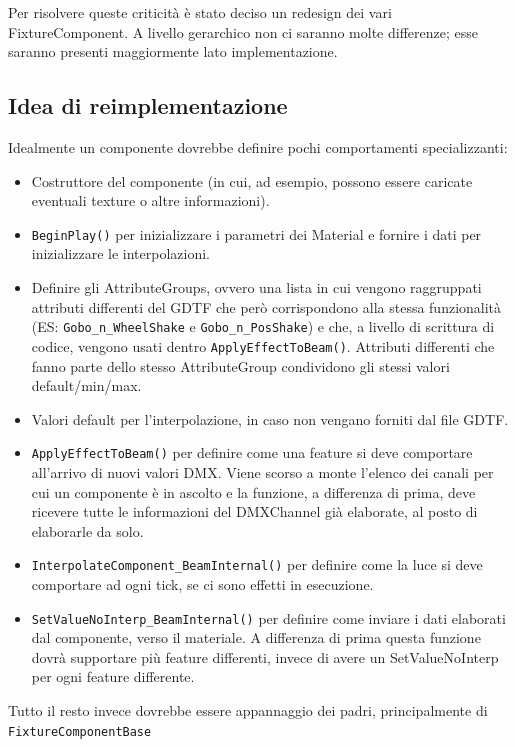 \documentclass[main.tex]{subfiles}
\begin{document}
Per risolvere queste criticità è stato deciso un redesign dei vari FixtureComponent. A livello gerarchico non ci saranno molte differenze; esse saranno presenti maggiormente lato implementazione.

\subsection{Idea di reimplementazione}\label{subsec:3_idea}
Idealmente un componente dovrebbe definire pochi comportamenti specializzanti:
\begin{itemize}
    \item Costruttore del componente (in cui, ad esempio, possono essere caricate eventuali texture o altre informazioni).
    \item \lstinline{BeginPlay()} per inizializzare i parametri dei Material e fornire i dati per inizializzare le interpolazioni.
    \item Definire gli AttributeGroups, ovvero una lista in cui vengono raggruppati attributi differenti del GDTF che però corrispondono alla stessa funzionalità (ES: \lstinline{Gobo_n_WheelShake} e \lstinline{Gobo_n_PosShake}) e che, a livello di scrittura di codice, vengono usati  dentro \lstinline{ApplyEffectToBeam()}. Attributi differenti che fanno parte dello stesso AttributeGroup condividono gli stessi valori default/min/max.
    \item Valori default per l'interpolazione, in caso non vengano forniti dal file GDTF.
    \item \lstinline{ApplyEffectToBeam()} per definire come una feature si deve comportare all'arrivo di nuovi valori DMX. Viene scorso a monte l'elenco dei canali per cui un componente è in ascolto e la funzione, a differenza di prima, deve ricevere tutte le informazioni del DMXChannel già elaborate, al posto di elaborarle da solo. 
    \item \lstinline{InterpolateComponent_BeamInternal()} per definire come la luce si deve comportare ad ogni tick, se ci sono effetti in esecuzione.
    \item \lstinline{SetValueNoInterp_BeamInternal()} per definire come inviare i dati elaborati dal componente, verso il materiale. A differenza di prima questa funzione dovrà supportare più feature differenti, invece di avere un SetValueNoInterp per ogni feature differente.
\end{itemize}

Tutto il resto invece dovrebbe essere appannaggio  dei padri, principalmente di \lstinline{FixtureComponentBase}\newline
\end{document}
